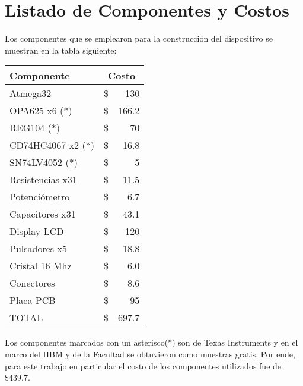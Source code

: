 \section{Listado de Componentes y Costos}
Los componentes que se emplearon para la construcción del dispositivo se muestran en la tabla siguiente:

\begin{table}[H]
\begin{center}
\begin{tabular}{|l|rr|}
    \hline
    \textbf{Componente} & \multicolumn{2}{c|}{\textbf{Costo}} \\ \hline
    Atmega32            & \hspace{2.8cm}\$ &   130 \\ \hline
    OPA625 x6 (*)       & \$               &   166.2 \\ \hline
    REG104 (*)          & \$               &   70 \\ \hline
    CD74HC4067 x2 (*)   & \$               &   16.8 \\ \hline
    SN74LV4052 (*)      & \$               &   5 \\ \hline
    Resistencias x31    & \$               &   11.5 \\ \hline
    Potenciómetro       & \$               &   6.7 \\ \hline
    Capacitores x31     & \$               &   43.1 \\ \hline
    Display LCD         & \$               &   120 \\ \hline
    Pulsadores x5       & \$               &   18.8 \\ \hline
    Cristal 16 Mhz      & \$               &   6.0 \\ \hline 
    Conectores          & \$               &   8.6 \\ \hline       
    Placa PCB           & \$               &   95 \\ \hline       
    TOTAL               & \$               &   697.7 \\ \hline
\end{tabular}
\end{center}
\end{table}

Los componentes marcados con un asterisco(*) son de Texas Instruments y en el marco del IIBM y de la Facultad se obtuvieron como muestras gratis. Por ende, para este trabajo en particular el costo de los componentes utilizados fue de $\$ 439.7$.\\

